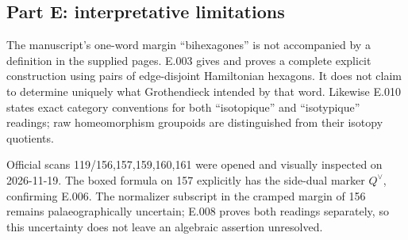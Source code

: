\subsection*{Part E: interpretative limitations}
The manuscript's one-word margin ``bihexagones'' is not accompanied by a
definition in the supplied pages. E.003 gives and proves a complete
explicit construction using pairs of edge-disjoint Hamiltonian hexagons.
It does not claim to determine uniquely what Grothendieck intended by
that word. Likewise E.010 states exact category conventions for both
``isotopique'' and ``isotypique'' readings; raw homeomorphism groupoids
are distinguished from their isotopy quotients.

Official scans 119/156,157,159,160,161 were opened and visually
inspected on 2026-11-19. The boxed formula on 157 explicitly has the
side-dual marker $Q^\vee$, confirming E.006. The normalizer subscript
in the cramped margin of 156 remains palaeographically uncertain;
E.008 proves both readings separately, so this uncertainty does not
leave an algebraic assertion unresolved.
